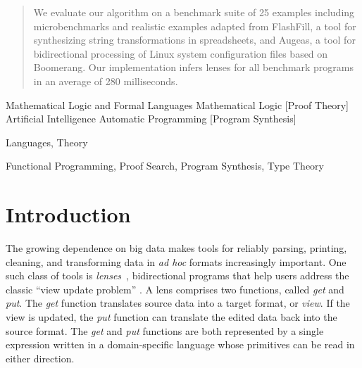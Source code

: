 \documentclass[numbers,10pt,preprint\ifanon ,nocopyrightspace\fi]{sigplanconf}
\begin{document}
\begin{abstract}
We evaluate our algorithm on a benchmark suite of 25 examples including
microbenchmarks and realistic examples adapted from FlashFill, a tool
for synthesizing string transformations in spreadsheets, and Augeas, a tool
for bidirectional processing of Linux system configuration files based on
Boomerang.  Our implementation infers lenses for all benchmark programs in
an average of 280 milliseconds.
\end{abstract}

\ifanon\else
{}
{Mathematical Logic and Formal Languages}
{Mathematical Logic}
[Proof Theory]
{Artificial Intelligence}
{Automatic Pro\-gramming}
[Program Synthesis]

\terms Languages, Theory

\keywords Functional Programming, Proof Search, Program Synthesis, Type Theory
\fi

\section{Introduction}

The growing dependence on big data makes tools for reliably parsing,
printing, cleaning, and transforming data in {\em ad hoc} formats
increasingly important.  One such class of tools is
\emph{lenses}~\cite{Focal2005-long}, bidirectional
programs that help users address the 
classic ``view update problem'' \cite{Bancilhon81, Dayal82}.  A lens
comprises two functions, called 
\emph{get} and \emph{put}.  The \emph{get} function translates source data
into a target format, or \emph{view}.  If the view is updated, the
\emph{put} function can translate the edited data back into the
source format.  The \emph{get} and \emph{put} functions are both represented
by a single expression written in a domain-specific language whose
primitives can be read in either direction.
\end{document}
